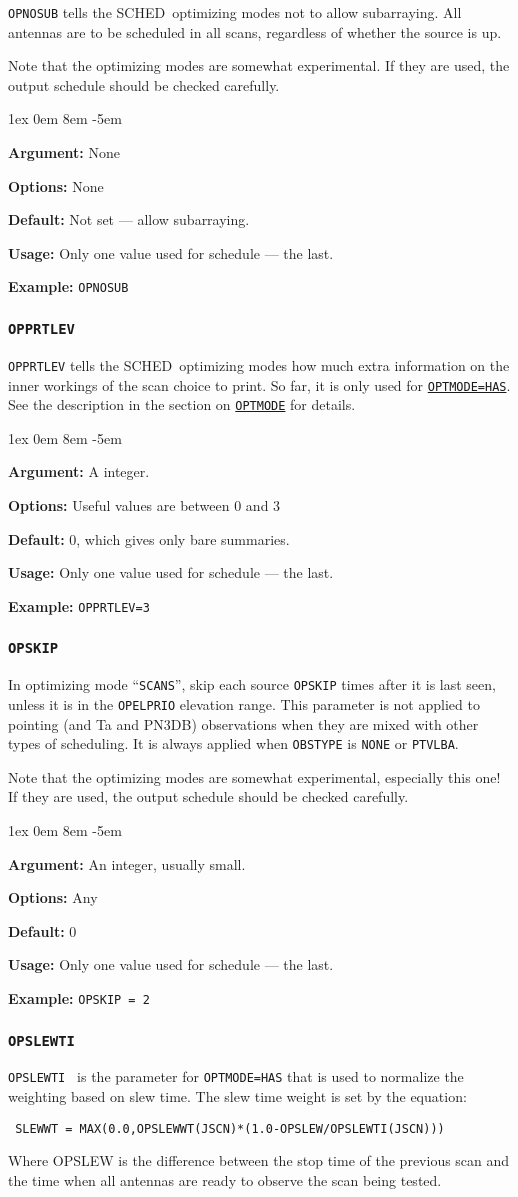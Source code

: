 \documentclass{report}
\newcommand{\schedb}{{\sc SCHED~}}
\newcommand{\rcwbox}[5]{
  \begin{list}{}{\parsep 1ex  \itemsep 0em
                 \leftmargin 8em  \itemindent -5em }
    \item {\bf Argument:} #1
    \item {\bf Options:}  #2
    \item {\bf Default:}  #3
    \item {\bf Usage:}    #4
    \item {\bf Example:}  #5
  \end{list}
}
\begin{document}
{\tt OPNOSUB} tells the \schedb optimizing modes not to allow
subarraying.  All antennas are to be scheduled in all scans, regardless
of whether the source is up.

Note that the optimizing modes are somewhat experimental.  If they are
used, the output schedule should be checked carefully.

\rcwbox
{None}
{None}
{Not set --- allow subarraying.}
{Only one value used for schedule --- the last.}
{{\tt OPNOSUB}}


\subsubsection{\label{MP:OPPRTLEV}{\tt OPPRTLEV}}

{\tt OPPRTLEV} tells the \schedb optimizing modes how much extra information
on the inner workings of the scan choice to print.  So far, it is only
used for 
{\hyperref[MP:OPTMODE]{{\tt OPTMODE=HAS}}}.  See the description in
the section on 
{\hyperref[MP:OPTMODE]{{\tt OPTMODE}}} for details.

\rcwbox
{A integer.}
{Useful values are between 0 and 3}
{0, which gives only bare summaries.}
{Only one value used for schedule --- the last.}
{{\tt OPPRTLEV=3}}


\subsubsection{\label{MP:OPSKIP}{\tt OPSKIP}}

In optimizing mode ``{\tt SCANS}'', skip each source {\tt OPSKIP}
times after it is last seen, unless it is in the {\tt OPELPRIO}
elevation range.  This parameter is not applied to pointing (and Ta
and PN3DB) observations when they are mixed with other types of
scheduling.  It is always applied when {\tt OBSTYPE} is {\tt NONE}
or {\tt PTVLBA}.

Note that the optimizing modes are somewhat experimental, especially
this one!  If they are used, the output schedule should be checked
carefully.

\rcwbox
{An integer, usually small.}
{Any}
{0}
{Only one value used for schedule --- the last.}
{{\tt OPSKIP = 2 }}

\subsubsection{\label{MP:OPSLEWTI}{\tt OPSLEWTI}}

{\tt OPSLEWTI } is the parameter for {\tt OPTMODE=HAS} that is used
to normalize the weighting based on slew time.  The slew time weight
is set by the equation:
\begin{verbatim}
 SLEWWT = MAX(0.0,OPSLEWWT(JSCN)*(1.0-OPSLEW/OPSLEWTI(JSCN)))
\end{verbatim}
Where OPSLEW is the difference between the stop time of the previous
scan and the time when all antennas are ready to observe the scan
being tested.
\end{document}
